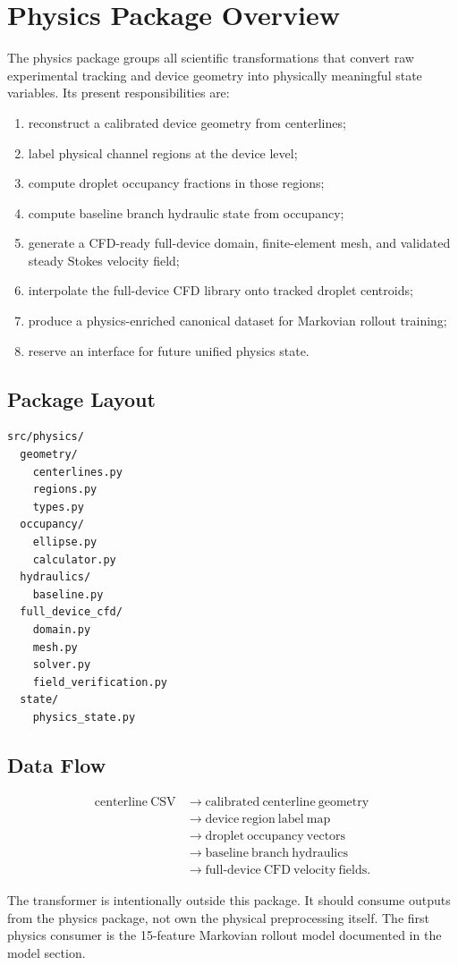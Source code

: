 \section{Physics Package Overview}

The physics package groups all scientific transformations that convert raw
experimental tracking and device geometry into physically meaningful state
variables. Its present responsibilities are:

\begin{enumerate}[label=\arabic*.]
  \item reconstruct a calibrated device geometry from centerlines;
  \item label physical channel regions at the device level;
  \item compute droplet occupancy fractions in those regions;
  \item compute baseline branch hydraulic state from occupancy;
  \item generate a CFD-ready full-device domain, finite-element mesh, and
        validated steady Stokes velocity field;
  \item interpolate the full-device CFD library onto tracked droplet centroids;
  \item produce a physics-enriched canonical dataset for Markovian rollout
        training;
  \item reserve an interface for future unified physics state.
\end{enumerate}

\subsection{Package Layout}

\begin{verbatim}
src/physics/
  geometry/
    centerlines.py
    regions.py
    types.py
  occupancy/
    ellipse.py
    calculator.py
  hydraulics/
    baseline.py
  full_device_cfd/
    domain.py
    mesh.py
    solver.py
    field_verification.py
  state/
    physics_state.py
\end{verbatim}

\subsection{Data Flow}

\[
\begin{aligned}
\mathrm{centerline~CSV}
&\rightarrow
\mathrm{calibrated~centerline~geometry}
\\
&\rightarrow
\mathrm{device~region~label~map}
\\
&\rightarrow
\mathrm{droplet~occupancy~vectors}
\\
&\rightarrow
\mathrm{baseline~branch~hydraulics}
\\
&\rightarrow
\mathrm{full\text{-}device~CFD~velocity~fields}.
\end{aligned}
\]

The transformer is intentionally outside this package. It should consume
outputs from the physics package, not own the physical preprocessing itself.
The first physics consumer is the 15-feature Markovian rollout model documented
in the model section.
